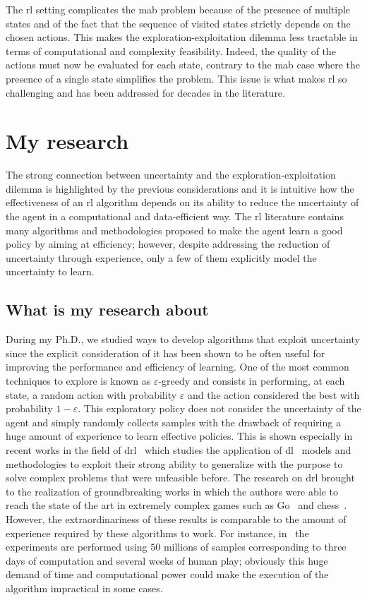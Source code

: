 The \gls{rl} setting complicates the \gls{mab} problem because of the presence of multiple states and of the fact that the sequence of visited states strictly depends on the chosen actions. This makes the exploration-exploitation dilemma less tractable in terms of computational and complexity feasibility. Indeed, the quality of the actions must now be evaluated for each state, contrary to the \gls{mab} case where the presence of a single state simplifies the problem. This issue is what makes \gls{rl} so challenging and has been addressed for decades in the literature.

\section{My research}
The strong connection between uncertainty and the exploration-exploitation dilemma is highlighted by the previous considerations and it is intuitive how the effectiveness of an \gls{rl} algorithm depends on its ability to reduce the uncertainty of the agent in a computational and data-efficient way. The \gls{rl} literature contains many algorithms and methodologies proposed to make the agent learn a good policy by aiming at efficiency; however, despite addressing the reduction of uncertainty through experience, only a few of them explicitly model the uncertainty to learn.

\subsection{What is my research about}
During my Ph.D., we studied ways to develop algorithms that exploit uncertainty since the explicit consideration of it has been shown to be often useful for improving the performance and efficiency of learning. One of the most common techniques to explore is known as $\varepsilon$-greedy and consists in performing, at each state, a random action with probability $\varepsilon$ and the action considered the best with probability $1 - \varepsilon$. This exploratory policy does not consider the uncertainty of the agent and simply randomly collects samples with the drawback of requiring a huge amount of experience to learn effective policies. This is shown especially in recent works in the field of \gls{drl}~\cite{mnih2015human, van2016deep, wang2015dueling} which studies the application of \gls{dl}~\cite{lecun2015deep} models and methodologies to exploit their strong ability to generalize with the purpose to solve complex problems that were unfeasible before. The research on \gls{drl} brought to the realization of groundbreaking works in which the authors were able to reach the state of the art in extremely complex games such as Go~\cite{silver2016mastering, silver2017mastering} and chess~\cite{silver2017chess}.
However, the extraordinariness of these results is comparable to the amount of experience required by these algorithms to work. For instance, in~\cite{mnih2015human} the experiments are performed using $50$ millions of samples corresponding to three days of computation and several weeks of human play; obviously this huge demand of time and computational power could make the execution of the algorithm impractical in some cases.


